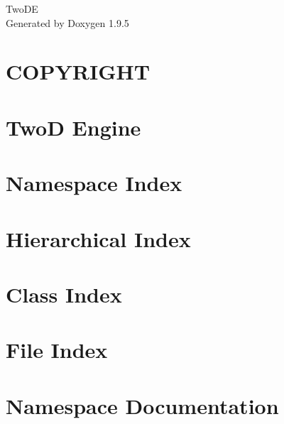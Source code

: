 \documentclass[twoside]{book}
\newcommand{\+}{\discretionary{\mbox{\scriptsize$\hookleftarrow$}}{}{}}
\newcommand{\clearemptydoublepage}{%
    \newpage{\pagestyle{empty}\cleardoublepage}%
  }
\begin{document}
  \raggedbottom
    \hypersetup{pageanchor=false,
                bookmarksnumbered=true,
                pdfencoding=unicode
               }
  \begin{titlepage}
  \vspace*{7cm}
  \begin{center}%
  {\Large Two\+DE}\\
  \vspace*{1cm}
  {\large Generated by Doxygen 1.9.5}\\
  \end{center}
  \end{titlepage}
  \clearemptydoublepage
  \tableofcontents
  \clearemptydoublepage
  \hypersetup{pageanchor=true}
\chapter{COPYRIGHT}
\label{md__c_o_p_y_r_i_g_h_t}

\chapter{TwoD Engine}
\label{md__r_e_a_d_m_e}

\chapter{Namespace Index}

\chapter{Hierarchical Index}

\chapter{Class Index}

\chapter{File Index}

\chapter{Namespace Documentation}


\end{document}
